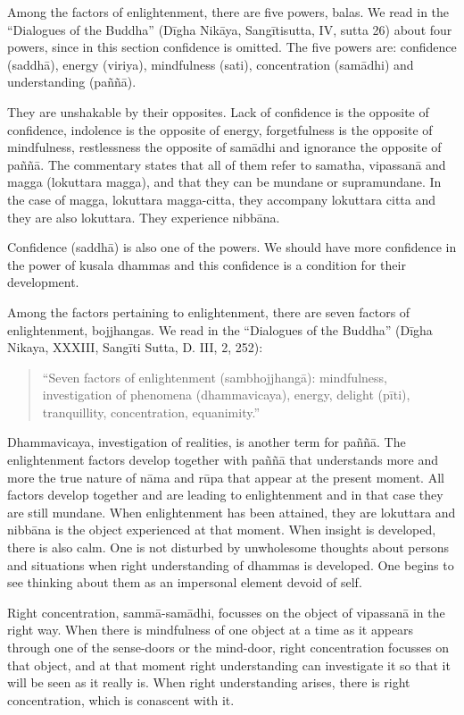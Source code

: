 Among the factors of enlightenment, there are five powers, balas. We
read in the ``Dialogues of the Buddha'' (Dīgha Nikāya, Sangītisutta, IV,
sutta 26) about four powers, since in this section confidence is
omitted. The five powers are: confidence (saddhā), energy (viriya),
mindfulness (sati), concentration (samādhi) and understanding (paññā).

They are unshakable by their opposites. Lack of confidence is the
opposite of confidence, indolence is the opposite of energy,
forgetfulness is the opposite of mindfulness, restlessness the opposite
of samādhi and ignorance the opposite of paññā. The commentary states
that all of them refer to samatha, vipassanā and magga (lokuttara
magga), and that they can be mundane or supramundane. In the case of
magga, lokuttara magga-citta, they accompany lokuttara citta and they
are also lokuttara. They experience nibbāna.

Confidence (saddhā) is also one of the powers. We should have more
confidence in the power of kusala dhammas and this confidence is a
condition for their development.~

Among the factors pertaining to enlightenment, there are seven factors
of enlightenment, bojjhangas. We read in the ``Dialogues of the Buddha''
(Dīgha Nikaya, XXXIII, Sangīti Sutta, D. III, 2, 252):

\begin{quote}
``Seven factors of enlightenment (sambhojjhangā): mindfulness,
investigation of phenomena (dhammavicaya), energy, delight (pīti),
tranquillity, concentration, equanimity.''
\end{quote}

Dhammavicaya, investigation of realities, is another term for paññā. The
enlightenment factors develop together with paññā that understands more
and more the true nature of nāma and rūpa that appear at the present
moment. All factors develop together and are leading to enlightenment
and in that case they are still mundane. When enlightenment has been
attained, they are lokuttara and nibbāna is the object experienced at
that moment. When insight is developed, there is also calm. One is not
disturbed by unwholesome thoughts about persons and situations when
right understanding of dhammas is developed. One begins to see thinking
about them as an impersonal element devoid of self.

Right concentration, sammā-samādhi, focusses on the object of vipassanā
in the right way. When there is mindfulness of one object at a time as
it appears through one of the sense-doors or the mind-door, right
concentration focusses on that object, and at that moment right
understanding can investigate it so that it will be seen as it really
is. When right understanding arises, there is right concentration, which
is conascent with it.

